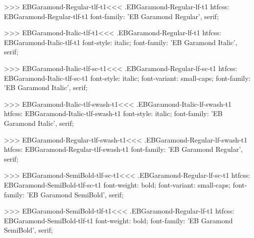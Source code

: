{{{{{{{>>>
\<EBGaramond-Regular-tlf-t1\><<<
.EBGaramond-Regular-lf-t1
htfcss:  EBGaramond-Regular-tlf-t1  font-family: 'EB Garamond Regular', serif;

>>>
\<EBGaramond-Italic-tlf-t1\><<<
.EBGaramond-Regular-lf-t1
htfcss:  EBGaramond-Italic-tlf-t1  font-style: italic; font-family: 'EB Garamond Italic', serif;

>>>
\<EBGaramond-Italic-tlf-sc-t1\><<<
.EBGaramond-Regular-lf-sc-t1
htfcss:  EBGaramond-Italic-tlf-sc-t1  font-style: italic; font-variant: small-caps; font-family: 'EB Garamond Italic', serif;

>>>
\<EBGaramond-Italic-tlf-swash-t1\><<<
.EBGaramond-Italic-lf-swash-t1
htfcss:  EBGaramond-Italic-tlf-swash-t1  font-style: italic; font-family: 'EB Garamond Italic', serif;

>>>
\<EBGaramond-Regular-tlf-swash-t1\><<<
.EBGaramond-Regular-lf-swash-t1
htfcss:  EBGaramond-Regular-tlf-swash-t1  font-family: 'EB Garamond Regular', serif;

>>>
\<EBGaramond-SemiBold-tlf-sc-t1\><<<
.EBGaramond-Regular-lf-sc-t1
htfcss:  EBGaramond-SemiBold-tlf-sc-t1  font-weight: bold; font-variant: small-caps; font-family: 'EB Garamond SemiBold', serif;

>>>
\<EBGaramond-SemiBold-tlf-t1\><<<
.EBGaramond-Regular-lf-t1
htfcss:  EBGaramond-SemiBold-tlf-t1  font-weight: bold; font-family: 'EB Garamond SemiBold', serif;

}}}}}}}
